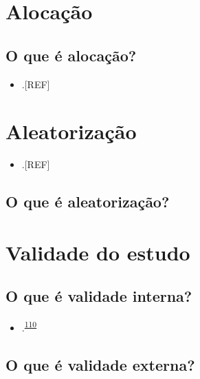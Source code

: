 \documentclass[
]{book}
\providecommand{\tightlist}{%
  \setlength{\itemsep}{0pt}\setlength{\parskip}{0pt}}
\begin{document}
\hypertarget{alocacao}{%
\section{Alocação}\label{alocacao}}

\hypertarget{o-que-uxe9-alocauxe7uxe3o}{%
\subsection{O que é alocação?}\label{o-que-uxe9-alocauxe7uxe3o}}

\begin{itemize}
\tightlist
\item
  .{[}REF{]}
\end{itemize}

\hypertarget{aleatorizauxe7uxe3o}{%
\section{Aleatorização}\label{aleatorizauxe7uxe3o}}

\begin{itemize}
\tightlist
\item
  .{[}REF{]}
\end{itemize}

\hypertarget{o-que-uxe9-aleatorizauxe7uxe3o}{%
\subsection{O que é aleatorização?}\label{o-que-uxe9-aleatorizauxe7uxe3o}}

\hypertarget{validade-estudo}{%
\section{Validade do estudo}\label{validade-estudo}}

\hypertarget{o-que-uxe9-validade-interna}{%
\subsection{O que é validade interna?}\label{o-que-uxe9-validade-interna}}

\begin{itemize}
\tightlist
\item
  .\textsuperscript{\protect\hyperlink{ref-findley2021}{110}}
\end{itemize}

\hypertarget{o-que-uxe9-validade-externa}{%
\subsection{O que é validade externa?}\label{o-que-uxe9-validade-externa}}
\end{document}

